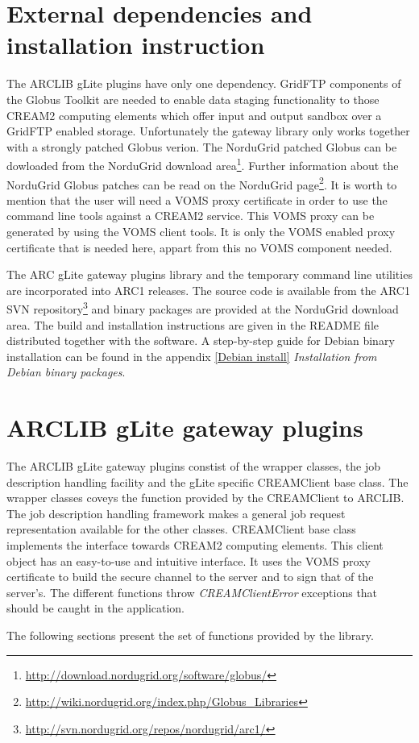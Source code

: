 \documentclass{article}
\begin{document}
\section{External dependencies and installation instruction}
\label{External dependencies and installation instruction}
The ARCLIB gLite plugins have only one dependency. GridFTP components of the Globus Toolkit\cite{globus} are needed to enable data staging functionality to those CREAM2 computing elements which offer input and output sandbox over a GridFTP enabled storage. Unfortunately the gateway library only works together with a strongly patched Globus verion. The NorduGrid patched Globus can be dowloaded from the NorduGrid download area\footnote{\url{http://download.nordugrid.org/software/globus/}}. Further information about the NorduGrid Globus patches can be read on the NorduGrid page\footnote{\url{http://wiki.nordugrid.org/index.php/Globus\_Libraries}}. It is worth to mention that the user will need a VOMS\cite{voms} proxy certificate in order to use the command line tools against a CREAM2 service. This VOMS proxy can be generated by using the VOMS client tools. It is only the VOMS enabled proxy certificate that is needed here, appart from this no VOMS component needed.\par
The ARC gLite gateway plugins library and the temporary command line utilities are incorporated into ARC1 releases. The source code is available from the ARC1 SVN repository\footnote{\url{http://svn.nordugrid.org/repos/nordugrid/arc1/}} and binary packages are provided at the NorduGrid download area. The build and installation instructions are given in the README file distributed together with the software. A step-by-step guide for Debian binary installation can be found in the appendix \ref{Debian install} \textit{Installation from Debian binary packages}.
\section{ARCLIB gLite gateway plugins}
\label{ARCLIB gLite gateway plugins}
The ARCLIB gLite gateway plugins constist of the wrapper classes, the job description handling facility and the gLite specific CREAMClient base class. The wrapper classes coveys the function provided by the CREAMClient to ARCLIB. The job description handling framework makes a general job request representation available for the other classes. CREAMClient base class implements the interface towards CREAM2 computing elements.
This client object has an easy-to-use and intuitive interface. It uses the VOMS proxy certificate to build the secure channel to the server and to sign that of the server's.
The different functions throw \textit{CREAMClientError} exceptions that should be caught in the application.\par
The following sections present the set of functions provided by the library.\par
\end{document}
